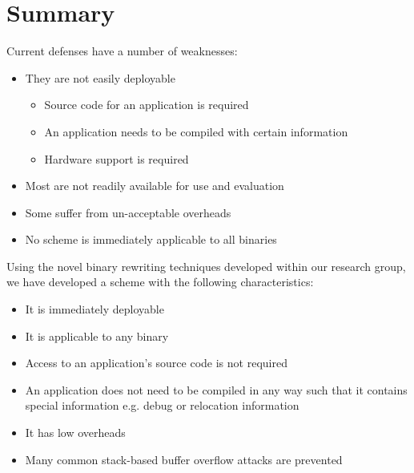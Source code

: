 \section{Summary}

Current defenses have a number of weaknesses:

\begin{itemize}

\item They are not easily deployable

  \begin{itemize}
  \item Source code for an application is required
  \item An application needs to be compiled with certain information
  \item Hardware support is required
  \end{itemize}

\item Most are not readily available for use and evaluation

\item Some suffer from un-acceptable overheads

\item No scheme is immediately applicable to all binaries

\end{itemize}

Using the novel binary rewriting techniques developed within our research group, we have developed a
scheme with the following characteristics:

\begin{itemize}

\item It is immediately deployable

\item It is applicable to any binary

\item Access to an application's source code is not required

\item An application does not need to be compiled in any way such that it contains special
information e.g. debug or relocation information

\item It has low overheads

\item Many common stack-based buffer overflow attacks are prevented

\end{itemize}
